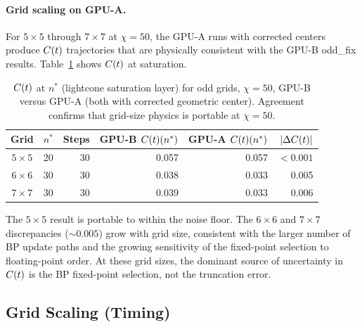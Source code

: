\paragraph{Grid scaling on GPU-A.}
For $5\times5$ through $7\times7$ at $\chi=50$, the GPU-A runs with corrected
centers produce $C(t)$ trajectories that are physically consistent with the
GPU-B odd\_fix results.
Table~\ref{tab:mi60_grids} shows $C(t)$ at saturation.

\begin{table}[ht]
\centering
\caption{$C(t)$ at $n^*$ (lightcone saturation layer) for odd grids,
 $\chi=50$, GPU-B versus GPU-A (both with corrected geometric center).
 Agreement confirms that grid-size physics is portable at $\chi=50$.}
\label{tab:mi60_grids}
\begin{tabular}{ccrrrr}
\toprule
Grid & $n^*$ & Steps & GPU-B $C(t)(n^*)$ & GPU-A $C(t)(n^*)$ & $|\Delta C(t)|$ \\
\midrule
$5\times5$ & 20 & 30 & 0.057 & 0.057 & $<0.001$ \\
$6\times6$ & 30 & 30 & 0.038 & 0.033 & 0.005 \\
$7\times7$ & 30 & 30 & 0.039 & 0.033 & 0.006 \\
\bottomrule
\end{tabular}
\end{table}

The $5\times5$ result is portable to within the noise floor.
The $6\times6$ and $7\times7$ discrepancies ($\sim 0.005$) grow with
grid size, consistent with the larger number of BP update paths and the
growing sensitivity of the fixed-point selection to floating-point order.
At these grid sizes, the dominant source of uncertainty in $C(t)$ is the
BP fixed-point selection, not the truncation error.

\FloatBarrier %
\subsection{Grid Scaling (Timing)}
\label{sec:grid_timing}

